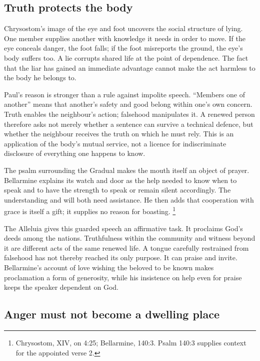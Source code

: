 \subsection{Truth protects the body}

Chrysostom's image of the eye and foot uncovers the social
structure of lying. One member supplies another with knowledge
it needs in order to move. If the eye conceals danger, the foot
falls; if the foot misreports the ground, the eye's body suffers
too. A lie corrupts shared life at the point of dependence.
The fact that the liar has gained an immediate advantage cannot
make the act harmless to the body he belongs to.

Paul's reason is stronger than a rule against impolite speech.
``Members one of another'' means that another's safety and
good belong within one's own concern. Truth enables the
neighbour's action; falsehood manipulates it. A renewed person
therefore asks not merely whether a sentence can survive a
technical defence, but whether the neighbour receives the
truth on which he must rely. This is an application of the
body's mutual service, not a licence for indiscriminate
disclosure of everything one happens to know.

The psalm surrounding the Gradual makes the mouth itself an
object of prayer. Bellarmine explains its watch and door as
the help needed to know when to speak and to have the strength
to speak or remain silent accordingly. The understanding and
will both need assistance. He then adds that cooperation with
grace is itself a gift; it supplies no reason for boasting.
\footnote{Chrysostom,  XIV, on 4:25;
Bellarmine,  140:3. Psalm 140:3 supplies context
for the appointed verse 2.}

The Alleluia gives this guarded speech an affirmative task.
It proclaims God's deeds among the nations. Truthfulness
within the community and witness beyond it are different
acts of the same renewed life. A tongue carefully restrained
from falsehood has not thereby reached its only purpose.
It can praise and invite. Bellarmine's account of love wishing
the beloved to be known makes proclamation a form of
generosity, while his insistence on help even for praise
keeps the speaker dependent on God.

\subsection{Anger must not become a dwelling place}

